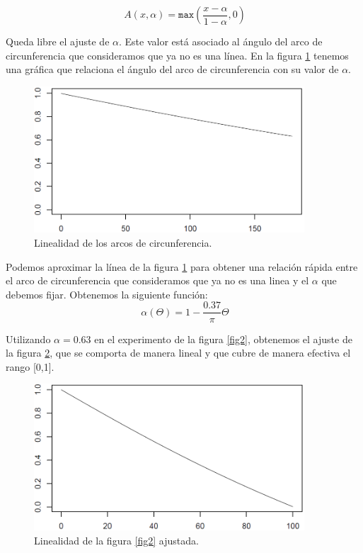 \[
\ A(x,\alpha) = \texttt{max}\left(\frac{x-\alpha}{1-\alpha} ,0\right)
\]

Queda libre el ajuste de $\alpha$. Este valor está asociado al ángulo del arco de circunferencia que consideramos que ya no es una línea. En la figura \ref{fig4} tenemos una gráfica que relaciona el ángulo del arco de circunferencia con su valor de $\alpha$.\\

\begin{figure}[H]
\begin{center}

\includegraphics[width=0.9\textwidth]{img/experimento-angulo.png}
\end{center}

\caption{Linealidad de los arcos de circunferencia.}
\label{fig4}
\end{figure}

Podemos aproximar la línea de la figura \ref{fig4} para obtener una relación rápida entre el arco de circunferencia que consideramos que ya no es una linea y el $\alpha$ que debemos fijar. Obtenemos la siguiente función:\\

\[
\ \alpha(\Theta) = 1- \frac{0.37}{\pi} \Theta
\]

Utilizando $\alpha = 0.63$ en el experimento de la figura \ref{fig2}, obtenemos el ajuste de la figura \ref{fig5}, que se comporta de manera lineal y que cubre de manera efectiva el rango [0,1].\\


\begin{figure}[H]
\begin{center}

\includegraphics[width=0.9\textwidth]{img/Ajuste-alfa.png}
\end{center}

\caption{Linealidad de la figura \ref{fig2} ajustada.}
\label{fig5}
\end{figure}

